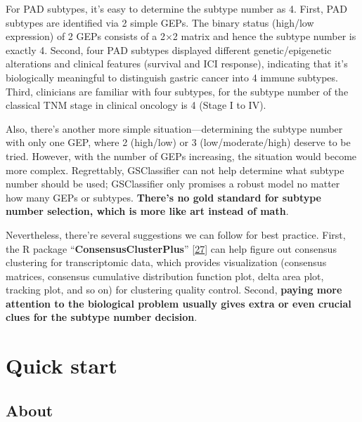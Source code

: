 \documentclass[
  12pt,
]{book}
\begin{document}
For PAD subtypes, it's easy to determine the subtype number as 4. First, PAD subtypes are identified via 2 simple GEPs. The binary status (high/low expression) of 2 GEPs consists of a 2×2 matrix and hence the subtype number is exactly 4. Second, four PAD subtypes displayed different genetic/epigenetic alterations and clinical features (survival and ICI response), indicating that it's biologically meaningful to distinguish gastric cancer into 4 immune subtypes. Third, clinicians are familiar with four subtypes, for the subtype number of the classical TNM stage in clinical oncology is 4 (Stage I to IV).

Also, there's another more simple situation---determining the subtype number with only one GEP, where 2 (high/low) or 3 (low/moderate/high) deserve to be tried. However, with the number of GEPs increasing, the situation would become more complex. Regrettably, GSClassifier can not help determine what subtype number should be used; GSClassifier only promises a robust model no matter how many GEPs or subtypes. \textbf{There's no gold standard for subtype number selection, which is more like art instead of math}.

Nevertheless, there're several suggestions we can follow for best practice. First, the R package ``\textbf{ConsensusClusterPlus}'' {[}\protect\hyperlink{ref-RN424}{27}{]} can help figure out consensus clustering for transcriptomic data, which provides visualization (consensus matrices, consensus cumulative distribution function plot, delta area plot, tracking plot, and so on) for clustering quality control. Second, \textbf{paying more attention to the biological problem usually gives extra or even crucial clues for the subtype number decision}.

\hypertarget{quick-start}{%
\chapter{Quick start}\label{quick-start}}

\hypertarget{about-1}{%
\section{About}\label{about-1}}
\end{document}
